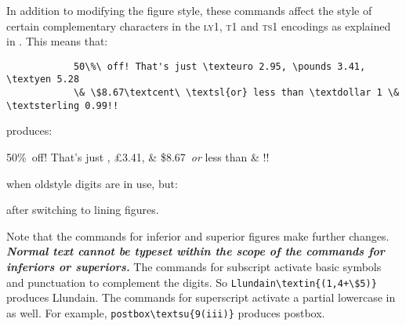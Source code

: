 \documentclass[11pt,british]{article}
\begin{document}
	In addition to modifying the figure style, these commands affect the style of certain complementary characters in the \textsc{ly1}, \textsc{t1} and \textsc{ts1} encodings as explained in . This means that:
		\begin{verbatim}
			50\%\ off! That's just \texteuro 2.95, \pounds 3.41, \textyen 5.28
			\& \$8.67\textcent\ \textsl{or} less than \textdollar 1 \& \textsterling 0.99!!
		\end{verbatim}
	 produces:
		\begin{center}
			50\%\ off! That's just , \pounds 3.41, 
			\& \$8.67\textcent\ \textsl{or} less than  \& !!
		\end{center}
		when oldstyle digits are in use, but:
		\begin{center}
		\end{center}
		after switching to lining figures.

	Note that the commands for inferior and superior figures make further changes. \textbf{\emph{Normal text cannot be typeset within the scope of the commands for inferiors or superiors.}} The commands for subscript activate basic symbols and punctuation to complement the digits. So \verb|Llundain\textin{(1,4+\$5)}| produces Llundain. The commands for superscript activate a partial lowercase in as well. For example, \verb|postbox| produces postbox\textsu{9(iii)}.
\end{document}
